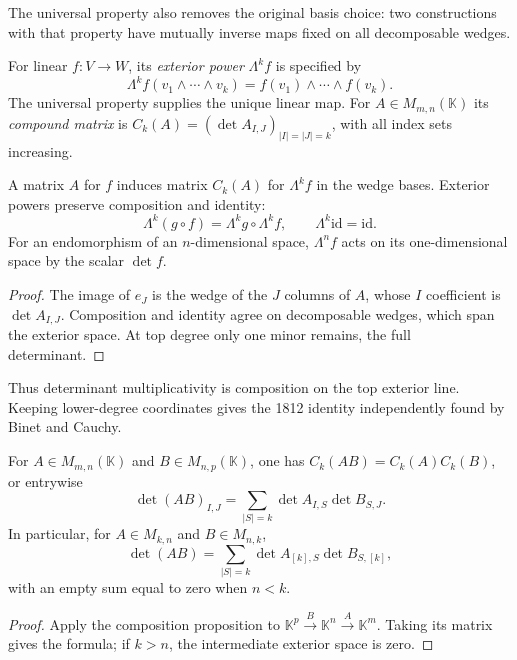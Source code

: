 The universal property also removes the original basis choice: two constructions with that property have mutually inverse maps fixed on all decomposable wedges.

\begin{definition}\label{linear:def:compound}
For linear $f:V\to W$, its \emph{exterior power} $\Lambda^kf$ is specified by
\[\Lambda^kf(v_1\wedge\cdots\wedge v_k)=f(v_1)\wedge\cdots\wedge f(v_k).
\]
The universal property supplies the unique linear map. For $A\in M_{m,n}(\mathbb K)$ its \emph{compound matrix} is $C_k(A)=(\det A_{I,J})_{|I|=|J|=k}$, with all index sets increasing.
\end{definition}

\begin{proposition}\label{linear:prop:compound}
A matrix $A$ for $f$ induces matrix $C_k(A)$ for $\Lambda^kf$ in the wedge bases. Exterior powers preserve composition and identity:
\[\Lambda^k(g\circ f)=\Lambda^kg\circ\Lambda^kf,\qquad\Lambda^k\mathrm{id}=\mathrm{id}.
\]
For an endomorphism of an $n$-dimensional space, $\Lambda^nf$ acts on its one-dimensional space by the scalar $\det f$.
\end{proposition}
\begin{proof}
The image of $e_J$ is the wedge of the $J$ columns of $A$, whose $I$ coefficient is $\det A_{I,J}$. Composition and identity agree on decomposable wedges, which span the exterior space. At top degree only one minor remains, the full determinant.
\end{proof}

Thus determinant multiplicativity is composition on the top exterior line. Keeping lower-degree coordinates gives the 1812 identity independently found by Binet and Cauchy.

\begin{theorem}\label{linear:thm:cauchybinet}
For $A\in M_{m,n}(\mathbb K)$ and $B\in M_{n,p}(\mathbb K)$, one has $C_k(AB)=C_k(A)C_k(B)$, or entrywise
\[\det(AB)_{I,J}=\sum_{|S|=k}\det A_{I,S}\det B_{S,J}.
\]
In particular, for $A\in M_{k,n}$ and $B\in M_{n,k}$,
\[\det(AB)=\sum_{|S|=k}\det A_{[k],S}\det B_{S,[k]},\]
with an empty sum equal to zero when $n<k$.
\end{theorem}
\begin{proof}
Apply the composition proposition to $\mathbb K^p\xrightarrow B\mathbb K^n\xrightarrow A\mathbb K^m$. Taking its matrix gives the formula; if $k>n$, the intermediate exterior space is zero.
\end{proof}

